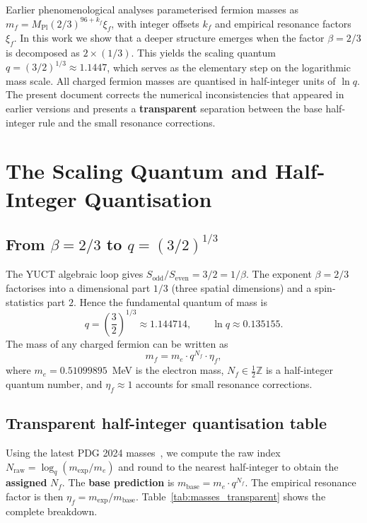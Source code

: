 \documentclass[12pt,a4paper]{article}
\begin{document}
	Earlier phenomenological analyses parameterised fermion masses as  
	\(m_f = M_{\mathrm{Pl}}(2/3)^{96+k_f}\xi_f\), with integer offsets \(k_f\) and empirical resonance factors \(\xi_f\).  
	In this work we show that a deeper structure emerges when the factor \(\beta=2/3\) is decomposed as \(2\times(1/3)\).  
	This yields the scaling quantum \(q=(3/2)^{1/3}\approx 1.1447\), which serves as the elementary step on the logarithmic mass scale.  
	All charged fermion masses are quantised in half-integer units of \(\ln q\).  
	The present document corrects the numerical inconsistencies that appeared in earlier versions and presents a \textbf{transparent} separation between the base half-integer rule and the small resonance corrections.
	
	\section{The Scaling Quantum and Half-Integer Quantisation}
	\subsection{From \(\beta = 2/3\) to \(q = (3/2)^{1/3}\)}
	The YUCT algebraic loop gives \(S_{\mathrm{odd}}/S_{\mathrm{even}} = 3/2 = 1/\beta\).  
	The exponent \(\beta=2/3\) factorises into a dimensional part \(1/3\) (three spatial dimensions) and a spin-statistics part \(2\).  
	Hence the fundamental quantum of mass is
	\begin{equation}
		q = \left(\frac{3}{2}\right)^{1/3} \approx 1.144714, \qquad \ln q \approx 0.135155.
	\end{equation}
	The mass of any charged fermion can be written as
	\begin{equation}
		m_f = m_e \cdot q^{N_f} \cdot \eta_f,
		\label{eq:quantized}
	\end{equation}
	where \(m_e = 0.51099895\)~MeV is the electron mass, \(N_f\in\frac12\mathbb{Z}\) is a half-integer quantum number, and \(\eta_f\approx 1\) accounts for small resonance corrections.
	
	\subsection{Transparent half-integer quantisation table}
	Using the latest PDG 2024 masses~\cite{PDG2024}, we compute the raw index \(N_{\text{raw}} = \log_q(m_{\text{exp}}/m_e)\) and round to the nearest half-integer to obtain the \textbf{assigned} \(N_f\).  
	The \textbf{base prediction} is \(m_{\text{base}} = m_e \cdot q^{N_f}\).  
	The empirical resonance factor is then \(\eta_f = m_{\text{exp}} / m_{\text{base}}\).  
	Table~\ref{tab:masses_transparent} shows the complete breakdown.
	
\end{document}
